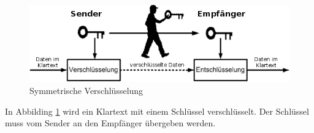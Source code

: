 \begin{figure}[ht]
\begin{center}
\includegraphics[width=15cm]{images/symmetrischeVerschluesselung.png}
\caption[Symmetrische Verschlüsselung Quelle:\newline ~~~~http://www.internet-sicherheit.de/typo3temp/pics/Schluesselaustausch\newline\_durch\_einen\_Kurier\_94b1b7125d.png]{Symmetrische Verschlüsselung}%
\label{fig:symVersch}
\end{center}
\end{figure}
In Abbilding \ref{fig:symVersch} wird ein Klartext mit einem Schlüssel verschlüsselt. Der Schlüssel muss vom Sender an den Empfänger übergeben werden. 
%

